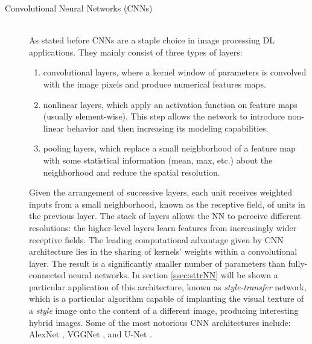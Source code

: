 \documentclass[12pt,a4paper]{report}
\begin{document}
\begin{description}
    \item [Convolutional Neural Networks (CNNs)] \hfill \\
        As stated before CNNs are a staple choice in image processing DL applications. They mainly consist of three types of layers:

        \begin{enumerate}[i]
            \item convolutional layers, where a kernel window of parameters is convolved with the image pixels and produce numerical features maps.

            \item nonlinear layers, which apply an activation function on feature maps (usually element-wise). This step allows the network to introduce non-linear behavior and then increasing its modeling capabilities.

            \item pooling layers, which replace a small neighborhood of a feature map with some statistical information (mean, max, etc.) about the neighborhood and reduce the spatial resolution.
        \end{enumerate}

        Given the arrangement of successive layers, each unit receives weighted inputs from a small neighborhood, known as the receptive field, of units in the previous layer. The stack of layers allows the NN to perceive different resolutions: the higher-level layers learn features from increasingly wider receptive fields. The leading computational advantage given by CNN architecture lies in the sharing of kernels' weights within a convolutional layer. The result is a significantly smaller number of parameters than fully-connected neural networks. In section \ref{ssec:sttrNN} will be shown a particular application of this architecture, known as \textit{style-transfer} network, which is a particular algorithm capable of implanting the visual texture of a \textit{style} image onto the content of a different image, producing interesting hybrid images. Some of the most notorious CNN architectures include: AlexNet \cite{AlexNet}, VGGNet \cite{1409.1556}, and U-Net \cite{U-net}.
\end{description}
\end{document}
